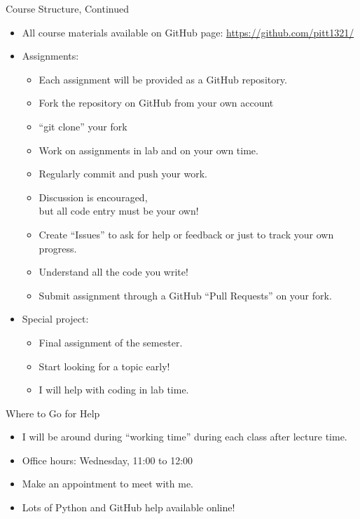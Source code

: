 \begin{frame}{Course Structure, Continued}
  \begin{itemize}
    \item All course materials available on GitHub page: \url{https://github.com/pitt1321/}
    \item Assignments:
    \begin{itemize}
      \item Each assignment will be provided as a GitHub repository.
      \item Fork the repository on GitHub from your own account
      \item ``git clone'' your fork
      \item Work on assignments in lab and on your own time.
      \item Regularly commit and push your work.
      \item Discussion is encouraged,\\ but all code entry must be your own!
      \item Create ``Issues'' to ask for help or feedback or just to track your own progress.
      \item Understand all the code you write!
      \item Submit assignment through a GitHub ``Pull Requests'' on your fork.
    \end{itemize}
    \item Special project:
    \begin{itemize}
      \item Final assignment of the semester.
      \item Start looking for a topic early!
      \item I will help with coding in lab time.
    \end{itemize}  
  \end{itemize}
\end{frame}


\begin{frame}{Where to Go for Help}  
\begin{itemize}
\item I will be around during ``working time'' during each class after lecture time.
\item Office hours: Wednesday, 11:00 to 12:00\\
\item Make an appointment to meet with me.
\item Lots of Python and GitHub help available online!
\end{itemize}
\end{frame}



